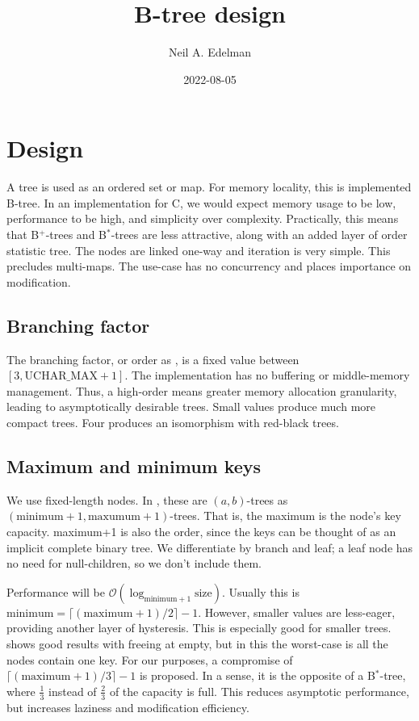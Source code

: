 \documentclass[12pt]{article}
\author{Neil A. Edelman}
\title{B-tree design}
\date{2022-08-05}
\begin{document}
\maketitle


\section{Design}

A tree is used as an ordered set or map. For memory locality, this is implemented B-tree\cite{bayer1972organization}. In an implementation for C, we would expect memory usage to be low, performance to be high, and simplicity over complexity. Practically, this means that B$^+$-trees and B$^*$-trees are less attractive, along with an added layer of order statistic tree. The nodes are linked one-way and iteration is very simple. This precludes multi-maps. The use-case has no concurrency and places importance on modification.

\subsection{Branching factor}

The branching factor, or order as \cite{knuth1997sorting}, is a fixed value between $[3,\text{UCHAR\_MAX}+1]$. The implementation has no buffering or middle-memory management. Thus, a high-order means greater memory allocation granularity, leading to asymptotically desirable trees. Small values produce much more compact trees. Four produces an isomorphism with red-black trees.

\subsection{Maximum and minimum keys}

We use fixed-length nodes. In \cite{goodrich2011data}, these are $(a,b)$-trees as $(\text{minimum}+1, \text{maxumum}+1)$\nobreakdash-trees. That is, the maximum is the node's key capacity. maximum+1 is also the order, since the keys can be thought of as an implicit complete binary tree. We differentiate by branch and leaf; a leaf node has no need for null-children, so we don't include them.

Performance will be
$\mathcal{O}(\log_{\text{minimum}+1} \text{size})$. Usually this is $\text{minimum} = \lceil (\text{maximum}+1)/2\rceil-1$. However,
 smaller values are less-eager, providing another layer of hysteresis. This is especially good for smaller trees. \cite{johnson1993b} shows good results with freeing at empty, but in this the worst-case is all the nodes contain one key.
For our purposes, a compromise of $\lceil(\text{maximum}+1)/3\rceil-1$ is proposed. In a sense, it is the opposite of a B$^*$-tree\cite{knuth1997sorting, douglas1979ubiquitous}, where $\frac{1}{3}$ instead of $\frac{2}{3}$ of the capacity is full. This reduces asymptotic performance, but increases laziness and modification efficiency.
\end{document}

